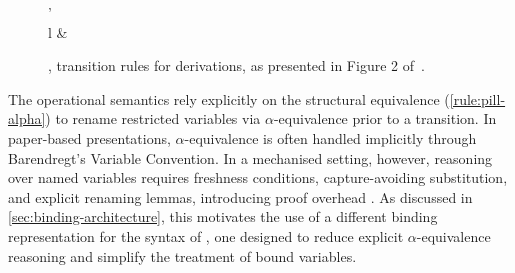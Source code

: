 \begin{figure}[p]
\begin{drules}
    {\plto
      {\deduce
        {}
        {}}
      {\lsync
        {}
        {}}
      {\deduce
        {}
        {'}}}
  \\
    {\plto
      {\deduce
        {}
        {}}
      {l}
      {\deduce
        {}
        {}}
    &}
  \end{drules}
  \caption{\pimll, transition rules for derivations, as presented in Figure 2 of~\citet{abs-2106-11818}.}
  \label{fig:mpill-sos}
\end{figure}

The operational semantics rely explicitly on the structural equivalence (\cref{rule:pill-alpha}) to rename restricted variables via $\alpha$-equivalence prior to a transition. In paper-based presentations, $\alpha$-equivalence is often handled implicitly through Barendregt's Variable Convention. In a mechanised setting, however, reasoning over named variables requires freshness conditions, capture-avoiding substitution, and explicit renaming lemmas, introducing proof overhead \citep{A05,C12}. As discussed in \cref{sec:binding-architecture}, this motivates the use of a different binding representation for the syntax of \pill{}, one designed to reduce explicit $\alpha$-equivalence reasoning and simplify the treatment of bound variables.

